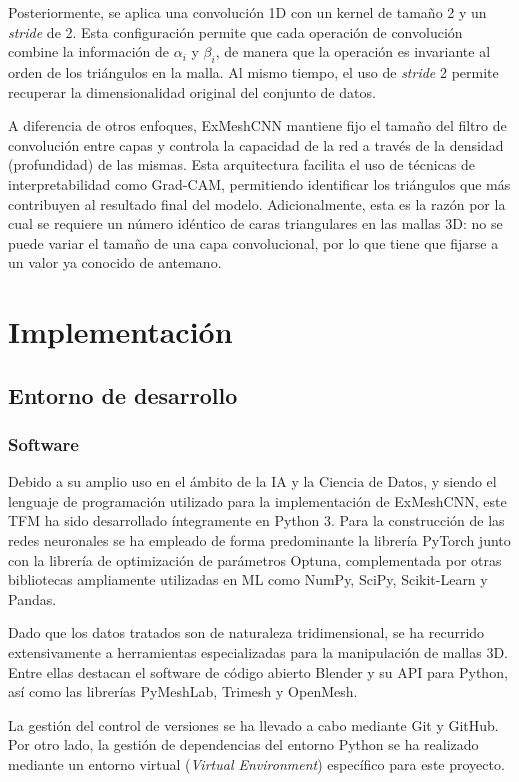 Posteriormente, se aplica una convolución 1D con un kernel de tamaño 2 y un \textit{stride} de 2. Esta configuración permite que cada operación de convolución combine la información de $\alpha_i$ y $\beta_i$, de manera que la operación es invariante al orden de los triángulos en la malla. Al mismo tiempo, el uso de \textit{stride} 2 permite recuperar la dimensionalidad original del conjunto de datos.

A diferencia de otros enfoques, ExMeshCNN mantiene fijo el tamaño del filtro de convolución entre capas y controla la capacidad de la red a través de la densidad (profundidad) de las mismas. Esta arquitectura facilita el uso de técnicas de interpretabilidad como Grad-CAM, permitiendo identificar los triángulos que más contribuyen al resultado final del modelo. Adicionalmente, esta es la razón por la cual se requiere un número idéntico de caras triangulares en las mallas 3D: no se puede variar el tamaño de una capa convolucional, por lo que tiene que fijarse a un valor ya conocido de antemano.

\section{Implementación}
\label{section4:implementation}
\subsection{Entorno de desarrollo}
\subsubsection{Software}
Debido a su amplio uso en el ámbito de la IA y la Ciencia de Datos, y siendo el lenguaje de programación utilizado para la implementación de ExMeshCNN, este TFM ha sido desarrollado íntegramente en Python 3. Para la construcción de las redes neuronales se ha empleado de forma predominante la librería PyTorch junto con la librería de optimización de parámetros Optuna, complementada por otras bibliotecas ampliamente utilizadas en ML como NumPy, SciPy, Scikit-Learn y Pandas.

Dado que los datos tratados son de naturaleza tridimensional, se ha recurrido extensivamente a herramientas especializadas para la manipulación de mallas 3D. Entre ellas destacan el software de código abierto Blender y su API para Python, así como las librerías PyMeshLab, Trimesh y OpenMesh.

La gestión del control de versiones se ha llevado a cabo mediante Git y GitHub. Por otro lado, la gestión de dependencias del entorno Python se ha realizado mediante un entorno virtual (\textit{Virtual Environment}) específico para este proyecto.

